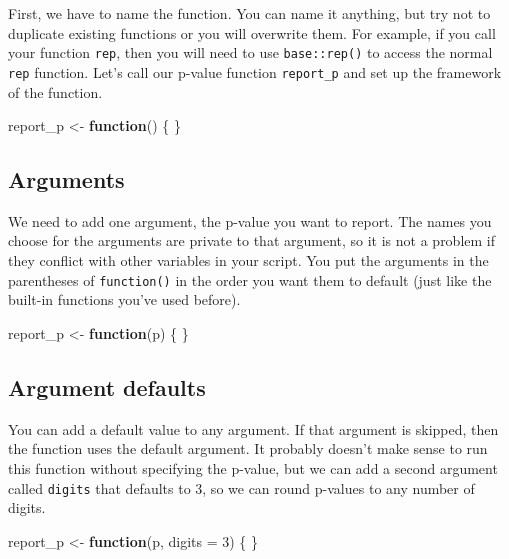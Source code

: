 \documentclass[
  oneside]{book}
\newenvironment{Shaded}{\begin{snugshade}}{\end{snugshade}}
\newcommand{\AttributeTok}[1]{\textcolor[rgb]{0.77,0.63,0.00}{#1}}
\newcommand{\ControlFlowTok}[1]{\textcolor[rgb]{0.13,0.29,0.53}{\textbf{#1}}}
\newcommand{\DecValTok}[1]{\textcolor[rgb]{0.00,0.00,0.81}{#1}}
\newcommand{\NormalTok}[1]{#1}
\newcommand{\OtherTok}[1]{\textcolor[rgb]{0.56,0.35,0.01}{#1}}
\begin{document}
First, we have to name the function. You can name it anything, but try not to duplicate existing functions or you will overwrite them. For example, if you call your function \texttt{rep}, then you will need to use \texttt{base::rep()} to access the normal \texttt{rep} function. Let's call our p-value function \texttt{report\_p} and set up the framework of the function.

\begin{Shaded}
\begin{Highlighting}[]
\NormalTok{report\_p }\OtherTok{\textless{}{-}} \ControlFlowTok{function}\NormalTok{() \{}
\NormalTok{\}}
\end{Highlighting}
\end{Shaded}

\hypertarget{arguments}{%
\subsection{Arguments}\label{arguments}}

We need to add one argument, the p-value you want to report. The names you choose for the arguments are private to that argument, so it is not a problem if they conflict with other variables in your script. You put the arguments in the parentheses of \texttt{function()} in the order you want them to default (just like the built-in functions you've used before).

\begin{Shaded}
\begin{Highlighting}[]
\NormalTok{report\_p }\OtherTok{\textless{}{-}} \ControlFlowTok{function}\NormalTok{(p) \{}
\NormalTok{\}}
\end{Highlighting}
\end{Shaded}

\hypertarget{defaults}{%
\subsection{Argument defaults}\label{defaults}}

You can add a default value to any argument. If that argument is skipped, then the function uses the default argument. It probably doesn't make sense to run this function without specifying the p-value, but we can add a second argument called \texttt{digits} that defaults to 3, so we can round p-values to any number of digits.

\begin{Shaded}
\begin{Highlighting}[]
\NormalTok{report\_p }\OtherTok{\textless{}{-}} \ControlFlowTok{function}\NormalTok{(p, }\AttributeTok{digits =} \DecValTok{3}\NormalTok{) \{}
\NormalTok{\}}
\end{Highlighting}
\end{Shaded}
\end{document}
